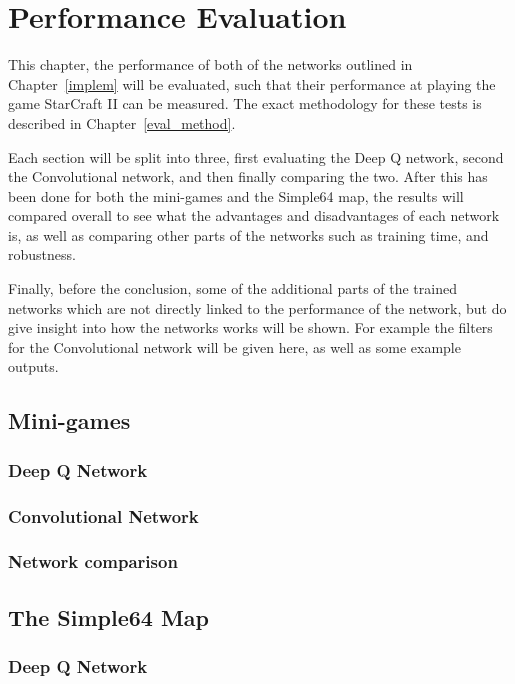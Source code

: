 \chapter{Performance Evaluation}%
\label{eval}

This chapter, the performance of both of the networks outlined in
Chapter~\ref{implem} will be evaluated, such that their performance at playing
the game StarCraft II can be measured. The exact methodology for these tests is
described in Chapter~\ref{eval_method}.

Each section will be split into three, first evaluating the Deep Q network,
second the Convolutional network, and then finally comparing the two.
After this has been done for both the mini-games and the Simple64 map, the
results will compared overall to see what the advantages and disadvantages of
each network is, as well as comparing other parts of the networks such as
training time, and robustness.

Finally, before the conclusion, some of the additional parts of the trained
networks which are not directly linked to the performance of the network, but
do give insight into how the networks works will be shown. For example the
filters for the Convolutional network will be given here, as well as some
example outputs.

\section{Mini-games}

\subsection{Deep Q Network}

\subsection{Convolutional Network}

\subsection{Network comparison}

\section{The Simple64 Map}

\subsection{Deep Q Network}

